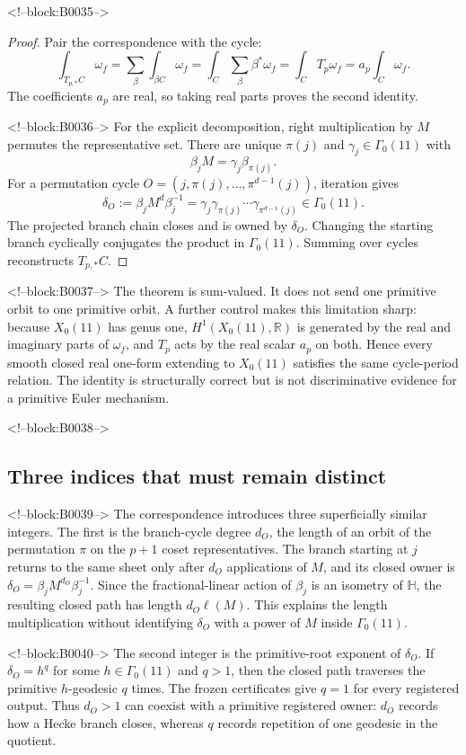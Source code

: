 \documentclass[11pt]{article}
\theoremstyle{definition}
\theoremstyle{remark}
\newcommand{\G}{\Gamma_0(11)}
\newcommand{\HH}{\mathbb H}
\newcommand{\RR}{\mathbb R}
\begin{document}
<!--block:B0035-->
\begin{proof}
Pair the correspondence with the cycle:
\[
\int_{T_{p,*}C}\omega_f
=\sum_\beta\int_{\beta C}\omega_f
=\int_C\sum_\beta\beta^*\omega_f
=\int_CT_p\omega_f
=a_p\int_C\omega_f.
\]
The coefficients $a_p$ are real, so taking real parts proves the second identity.

<!--block:B0036-->
For the explicit decomposition, right multiplication by $M$ permutes the representative set. There are unique $\pi(j)$ and $\gamma_j\in\G$ with
\[
\beta_jM=\gamma_j\beta_{\pi(j)}.
\]
For a permutation cycle $O=(j,\pi(j),\ldots,\pi^{d-1}(j))$, iteration gives
\[
\delta_O:=\beta_jM^d\beta_j^{-1}
=\gamma_j\gamma_{\pi(j)}\cdots\gamma_{\pi^{d-1}(j)}\in\G.
\]
The projected branch chain closes and is owned by $\delta_O$. Changing the starting branch cyclically conjugates the product in $\G$. Summing over cycles reconstructs $T_{p,*}C$.
\end{proof}

<!--block:B0037-->
The theorem is sum-valued. It does not send one primitive orbit to one primitive orbit. A further control makes this limitation sharp: because $X_0(11)$ has genus one, $H^1(X_0(11),\RR)$ is generated by the real and imaginary parts of $\omega_f$, and $T_p$ acts by the real scalar $a_p$ on both. Hence every smooth closed real one-form extending to $X_0(11)$ satisfies the same cycle-period relation. The identity is structurally correct but is not discriminative evidence for a primitive Euler mechanism.

<!--block:B0038-->
\subsection{Three indices that must remain distinct}

<!--block:B0039-->
The correspondence introduces three superficially similar integers. The first is the branch-cycle degree $d_O$, the length of an orbit of the permutation $\pi$ on the $p+1$ coset representatives. The branch starting at $j$ returns to the same sheet only after $d_O$ applications of $M$, and its closed owner is $\delta_O=\beta_jM^{d_O}\beta_j^{-1}$. Since the fractional-linear action of $\beta_j$ is an isometry of $\HH$, the resulting closed path has length $d_O\ell(M)$. This explains the length multiplication without identifying $\delta_O$ with a power of $M$ inside $\G$.

<!--block:B0040-->
The second integer is the primitive-root exponent of $\delta_O$. If $\delta_O=h^q$ for some $h\in\G$ and $q>1$, then the closed path traverses the primitive $h$-geodesic $q$ times. The frozen certificates give $q=1$ for every registered output. Thus $d_O>1$ can coexist with a primitive registered owner: $d_O$ records how a Hecke branch closes, whereas $q$ records repetition of one geodesic in the quotient.
\end{document}
